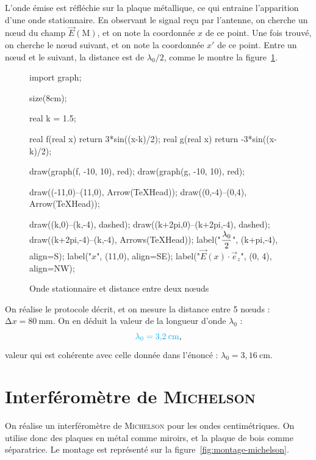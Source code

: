 \documentclass[a4paper,twocolumn,10pt,margin=0.5in]{extreport}
\def\res#1{{\color{cyan}#1}}
\begin{document}
	L'onde émise est réfléchie sur la plaque métallique, ce qui entraine l'apparition d'une onde stationnaire.
	En observant le signal reçu par l'antenne, on cherche un nœud du champ $\vec{E}(\mathrm{M})$, et on note la coordonnée $x$ de ce point.
	Une fois trouvé, on cherche le nœud suivant, et on note la coordonnée $x'$ de ce point.
	Entre un nœud et le suivant, la distance est de $\lambda_0 / 2$, comme le montre la figure~\ref{fig:onde-stationnaire}.

	\begin{figure}[H]
		\centering
		\begin{asy}
			import graph;

			size(8cm);

			real k = 1.5;

			real f(real x) { return 3*sin((x-k)/2); }
			real g(real x) { return -3*sin((x-k)/2); }

			draw(graph(f, -10, 10), red);
			draw(graph(g, -10, 10), red);

			draw((-11,0)--(11,0), Arrow(TeXHead));
			draw((0,-4)--(0,4), Arrow(TeXHead));

			draw((k,0)--(k,-4), dashed);
			draw((k+2pi,0)--(k+2pi,-4), dashed);
			draw((k+2pi,-4)--(k,-4), Arrows(TeXHead));
			label("$\displaystyle\frac{\lambda_0}{2}$", (k+pi,-4), align=S);
			label("$x$", (11,0), align=SE);
			label("$\vec{E}(x) \cdot \vec{e}_z$", (0, 4), align=NW);
		\end{asy}
		\caption{Onde stationnaire et distance entre deux nœuds}
		\label{fig:onde-stationnaire}
	\end{figure}

	On réalise le protocole décrit, et on mesure la distance entre 5 nœuds : \res{$\mathrm{\Delta}x = 80\:\mathrm{mm}$}.
	On en déduit la valeur de la longueur d'onde $\lambda_0$ : \[
		\res{\lambda_0 = 3{,}2\:\mathrm{cm}}
	,\] valeur qui est cohérente avec celle donnée dans l'énoncé : $\lambda_0 = 3{,}16\:\mathrm{cm}$.

	\bigskip

	\section{Interféromètre de \textsc{Michelson}}

	On réalise un interféromètre de \textsc{Michelson} pour les ondes centimétriques.
	On utilise donc des plaques en métal comme miroirs, et la plaque de bois comme séparatrice.
	Le montage est représenté sur la figure~\ref{fig:montage-michelson}.
\end{document}
